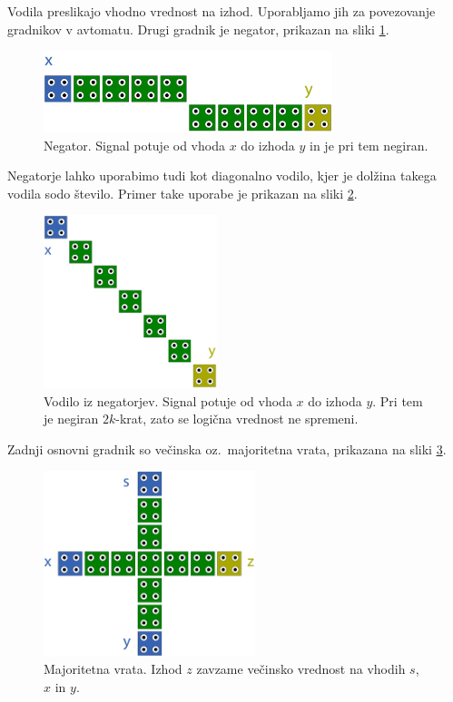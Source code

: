 \documentclass[a4paper, 11pt]{article}
\begin{document}
Vodila preslikajo vhodno vrednost na izhod.
Uporabljamo jih za povezovanje gradnikov v avtomatu.
Drugi gradnik je negator, prikazan na sliki \ref{img-pregled-negator}.

\begin{figure}[h]
	\centering
	\includegraphics[width=0.75\textwidth]{../img/pregled/negator.pdf}
	\caption{Negator. Signal potuje od vhoda $x$ do izhoda $y$ in je pri tem negiran.}
	\label{img-pregled-negator}
\end{figure}

Negatorje lahko uporabimo tudi kot diagonalno vodilo, kjer je dolžina takega vodila sodo število.
Primer take uporabe je prikazan na sliki \ref{img-pregled-negbus}.

\begin{figure}[h]
	\centering
	\includegraphics[width=0.45\textwidth]{../img/pregled/negbus.pdf}
	\caption{Vodilo iz negatorjev. Signal potuje od vhoda $x$ do izhoda $y$. Pri tem je negiran $2k$-krat, zato se logična vrednost ne spremeni.}
	\label{img-pregled-negbus}
\end{figure}

Zadnji osnovni gradnik so večinska oz.~majoritetna vrata, prikazana na sliki \ref{img-pregled-major}.

\begin{figure}[h]
	\centering
	\includegraphics[width=0.55\textwidth]{../img/pregled/major.pdf}
	\caption{Majoritetna vrata. Izhod $z$ zavzame večinsko vrednost na vhodih $s$, $x$ in $y$.}
	\label{img-pregled-major}
\end{figure}
\end{document}
